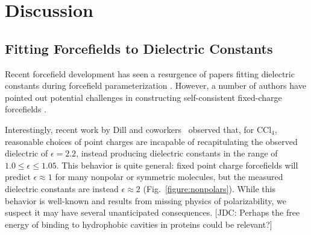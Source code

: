 \documentclass[aps,pre,twocolumn,nofootinbib,superscriptaddress,linenumbers]{revtex4-1}
\begin{document}
\section{Discussion}


\subsection{Fitting Forcefields to Dielectric Constants}

Recent forcefield development has seen a resurgence of papers fitting dielectric constants during forcefield parameterization \cite{wang2014building, fennell2014fixed}.  
However, a number of authors have pointed out potential challenges in constructing self-consistent fixed-charge forcefields \cite{fennell2012simple, leontyev2014polarizable}.  

Interestingly, recent work by Dill and coworkers~\cite{fennell2012simple} observed that, for $\mathrm{CCl_4}$, reasonable choices of point charges are incapable of recapitulating the observed dielectric of $\epsilon = 2.2$, instead producing dielectric constants in the range of $1.0 \le \epsilon \le 1.05$.  
This behavior is quite general: fixed point charge forcefields will predict $\epsilon \approx 1$ for many nonpolar or symmetric molecules, but the measured dielectric constants are instead $\epsilon \approx 2$ (Fig.~\ref{figure:nonpolars}).  
While this behavior is well-known and results from missing physics of polarizability, we suspect it may have several unanticipated consequences.
{\color{red}[JDC: Perhaps the free energy of binding to hydrophobic cavities in proteins could be relevant?]}

\end{document}
